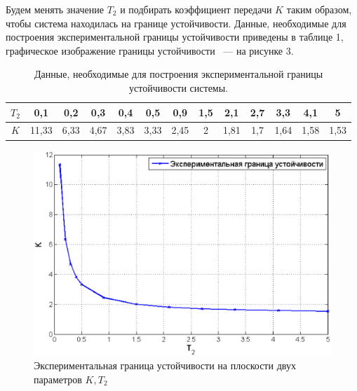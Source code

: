 \documentclass[12pt,a4paper]{article}
\begin{document}
Будем менять значение $T_2$ и подбирать коэффициент передачи $K$ таким образом, чтобы система находилась на границе устойчивости. Данные, необходимые для построения экспериментальной границы устойчивости приведены в таблице 1, графическое изображение границы устойчивости ~--- на рисунке 3.
\begin{table}[h!]
	\caption{Данные, необходимые для построения экспериментальной границы устойчивости системы.}
	\renewcommand{\arraystretch}{1.8} %
	\begin{tabular}{|c|c|c|c|c|c|c|c|c|c|c|c|c|}
		\hline $T_2$ & 0,1 & 0,2 & 0,3 & 0,4 & 0,5 & 0,9 & 1,5 & 2,1 & 2,7 & 3,3 & 4,1 & 5\\
		\hline $K$ & 11,33 & 6,33 & 4,67 & 3,83 & 3,33 & 2,45 & 2 & 1,81 & 1,7 & 1,64 & 1,58 & 1,53\\
		\hline
	\end{tabular}	
\end{table} 
\begin{figure}[h!]
	\centering
	\includegraphics[width=0.9\linewidth]{eksp-gr.eps}
	\caption{Экспериментальная граница устойчивости на плоскости двух параметров $K, T_2$}
\end{figure}
\end{document}
